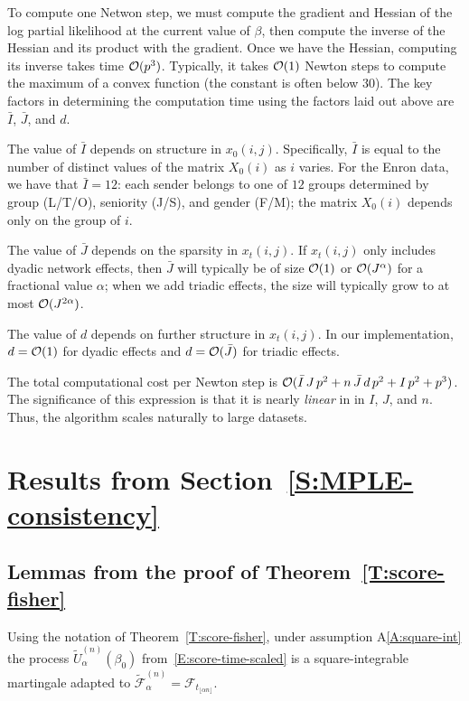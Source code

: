\documentclass[final]{statsoc}
\begin{document}
To compute one Netwon step, we must compute the gradient and Hessian of the
log partial likelihood at the current value of $\beta$, then compute the
inverse of the Hessian and its product with the gradient.  Once we have the
Hessian, computing its inverse takes time $\mathcal{O}(p^3)$.  Typically, it takes
$\mathcal{O}(1)$ Newton steps to compute the maximum of a convex function (the
constant is often below $30$).  The key factors in determining the
computation time using the factors laid out above are $\bar I$, $\bar J$, and
$d$.

The value of $\bar I$ depends on structure in $x_0(i,j)$.  Specifically, 
$\bar I$ is equal to the number of
distinct values of the matrix $X_0(i)$ as $i$
varies.  For the Enron data, we have that $\bar I = 12$: each sender
belongs to one of $12$ groups determined by group (L/T/O), seniority (J/S),
and gender (F/M); the matrix $X_0(i)$ depends only on the group of $i$.

The value of $\bar J$ depends on the sparsity in $x_t(i,j)$.  If
$x_t(i,j)$ only includes dyadic network effects, then $\bar J$ will typically
be of size $\mathcal{O}(1)$ or $\mathcal{O}(J^\alpha)$ for a fractional value $\alpha$; when we add triadic effects, the size will typically
grow to at most $\mathcal{O}(J^{2 \alpha})$.

The value of $d$ depends on further structure in $x_t(i,j)$.  In our
implementation, $d = \mathcal{O}(1)$ for dyadic effects and $d = \mathcal{O}(\bar J)$ for
triadic effects.

The total computational cost per Newton step is 
$\mathcal{O}(\bar I \, J \, p^2  + n \, \bar J \, d \, p^2 + I \, p^2 + p^3)$.
The significance of this expression is that it is nearly \emph{linear}
in in $I$, $J$, and $n$.  Thus, the algorithm scales naturally to large
datasets.


\newcommand{\MPLEconsistencysection}{\ref{S:MPLE-consistency}}
\section{Results from Section~\protect\MPLEconsistencysection{}}
\label{S:MPLE-consistency-proofs}

\subsection{Lemmas from the proof of Theorem~\ref{T:score-fisher}}

\begin{lemma}\label{L:adapted-martingale}
Using the notation of Theorem~\ref{T:score-fisher}, under assumption
A\ref{A:square-int} the process $\tilde U_\alpha^{(n)}(\beta_0)$
from~\eqref{E:score-time-scaled} is a square-integrable martingale adapted to
\(
    \mathcal{\tilde F}^{(n)}_\alpha
        =
        \mathcal{F}_{t_{\lfloor \alpha n \rfloor}}.
\)
\end{lemma}
\end{document}
